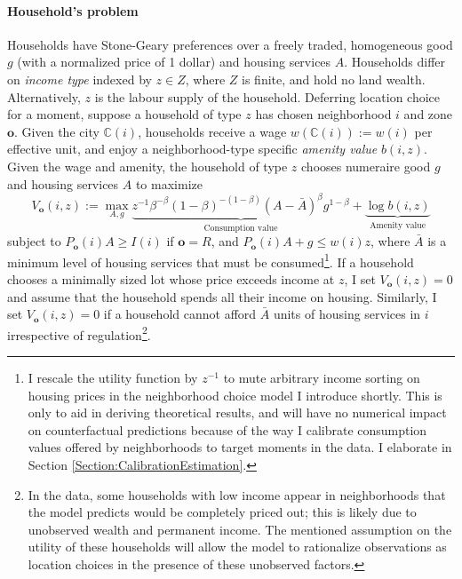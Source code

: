 \documentclass[12pt]{article}
\begin{document}
	\paragraph*{Household's problem}
	Households have Stone-Geary preferences over a freely traded, homogeneous good $g$ (with a normalized price of 1 dollar) and housing services $A$. Households differ on \textit{income type} indexed by $z \in Z$, where $Z$ is finite, and hold no land wealth. Alternatively, $z$ is the labour supply of the household. Deferring location choice for a moment, suppose a household of type $z$ has chosen neighborhood $i$ and zone $\boldsymbol{o}$. Given the city $\mathbb{C}(i)$, households receive a wage $w(\mathbb{C}(i)) := w(i)$ per effective unit, and enjoy a neighborhood-type specific \textit{amenity value} $b(i, z)$. Given the wage and amenity, the household of type $z$ chooses numeraire good $g$ and housing services $A$ to maximize
	\begin{equation}\label{utility}
	V_{\boldsymbol{o}}(i, z) := \max_{A, g} \underbrace{z^{-1}\beta^{-\beta}(1-\beta)^{-(1-\beta)}(A - \bar{A})^{\beta}g^{1-\beta}}_{\text{Consumption value}} + \underbrace{\log b(i, z)}_{\text{Amenity value}}
	\end{equation} 
	subject to $P_{\boldsymbol{o}}(i)A \geq I(i)$ if $\boldsymbol{o} = R$, and $P_{\boldsymbol{o}}(i)A + g \leq w(i)z$, where $\bar{A}$ is a minimum level of housing services that must be consumed\footnote{I rescale the utility function by $z^{-1}$ to mute arbitrary income sorting on housing prices in the neighborhood choice model I introduce shortly. This is only to aid in deriving theoretical results, and will have no numerical impact on counterfactual predictions because of the way I calibrate consumption values offered by neighborhoods to target moments in the data. I elaborate in Section \ref{Section:CalibrationEstimation}.}. If a household chooses a minimally sized lot whose price exceeds income at $z$, I set  $V_{\boldsymbol{o}}(i, z) = 0$ and assume that the household spends all their income on housing. Similarly, I set $V_{\boldsymbol{o}}(i, z) = 0$ if a household cannot afford $\bar{A}$ units of housing services in $i$ irrespective of regulation\footnote{In the data, some households with low income appear in neighborhoods that the model predicts would be completely priced out; this is likely due to unobserved wealth and permanent income. The mentioned assumption on the utility of these households will allow the model to rationalize observations as location choices in the presence of these unobserved factors.}. 
	
\end{document}
